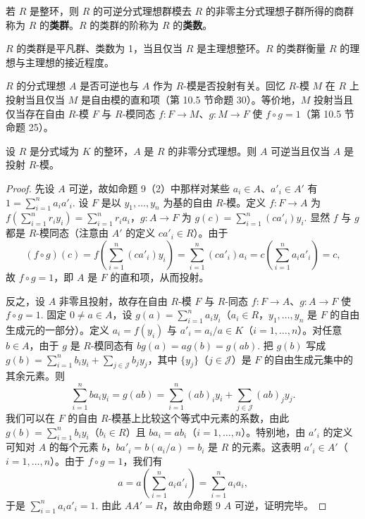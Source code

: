 \begin{definition}
若 \(R\) 是整环，则 \(R\) 的可逆分式理想群模去 \(R\) 的非零主分式理想子群所得的商群称为 \(R\) 的\textbf{类群}。\(R\) 的类群的阶称为 \(R\) 的\textbf{类数}。
\end{definition}

\(R\) 的类群是平凡群、类数为 1，当且仅当 \(R\) 是主理想整环。\(R\) 的类群衡量 \(R\) 的理想与主理想的接近程度。

\(R\) 的分式理想 \(A\) 是否可逆也与 \(A\) 作为 \(R\)-模是否投射有关。回忆 \(R\)-模 \(M\) 在 \(R\) 上投射当且仅当 \(M\) 是自由模的直和项（第 10.5 节命题 30）。等价地，\(M\) 投射当且仅当存在自由 \(R\)-模 \(F\) 与 \(R\)-模同态 \(f : F \to M\)、\(g : M \to F\) 使 \(f \circ g = 1\)（第 10.5 节命题 25）。

\begin{proposition}\label{pro:16.10}
设 \(R\) 是分式域为 \(K\) 的整环，\(A\) 是 \(R\) 的非零分式理想。则 \(A\) 可逆当且仅当 \(A\) 是投射 \(R\)-模。
\end{proposition}

\begin{proof}
先设 \(A\) 可逆，故如命题 9（2）中那样对某些 \(a_i \in A\)、\(a'_i \in A'\) 有 \(1 = \sum_{i=1}^{n}a_ia'_i\). 设 \(F\) 是以 \(y_1, \ldots, y_n\) 为基的自由 \(R\)-模。定义 \(f : F \to A\) 为 \(f(\sum_{i=1}^{n}r_iy_i) = \sum_{i=1}^{n}r_ia_i\)，\(g : A \to F\) 为 \(g(c) = \sum_{i=1}^{n}(ca'_i)y_i\). 显然 \(f\) 与 \(g\) 都是 \(R\)-模同态（注意由 \(A'\) 的定义 \(ca'_i \in R\)）。由于
\[
(f \circ g)(c) = f\left(\sum_{i=1}^{n}(ca'_i)y_i\right) = \sum_{i=1}^{n}(ca'_i)a_i = c\left(\sum_{i=1}^{n}a_ia'_i\right) = c,
\]
故 \(f \circ g = 1\)，即 \(A\) 是 \(F\) 的直和项，从而投射。

反之，设 \(A\) 非零且投射，故存在自由 \(R\)-模 \(F\) 与 \(R\)-同态 \(f : F \to A\)、\(g : A \to F\) 使 \(f \circ g = 1\). 固定 \(0 \neq a \in A\)，设 \(g(a) = \sum_{i=1}^{n}a_iy_i\)（\(a_i \in R\)，\(y_1, \ldots, y_n\) 是 \(F\) 的自由生成元的一部分）。定义 \(a_i = f(y_i)\) 与 \(a'_i = a_i/a \in K\)（\(i = 1, \ldots, n\)）。对任意 \(b \in A\)，由于 \(g\) 是 \(R\)-模同态有 \(bg(a) = ag(b) = g(ab)\). 把 \(g(b)\) 写成 \(g(b) = \sum_{i=1}^{n}b_iy_i+\sum_{j \in \mathcal{J}}b_jy_j\)，其中 \(\{y_j\}\)（\(j \in \mathcal{J}\)）是 \(F\) 的自由生成元集中的其余元素。则
\[
\sum_{i=1}^{n}ba_iy_i = g(ab) = \sum_{i=1}^{n}(ab)_iy_i+\sum_{j \in \mathcal{J}}(ab)_jy_j.
\]
我们可以在 \(F\) 的自由 \(R\)-模基上比较这个等式中元素的系数，由此 \(g(b) = \sum_{i=1}^{n}b_iy_i\)（\(b_i \in R\)）且 \(ba_i = ab_i\)（\(i = 1, \ldots, n\)）。特别地，由 \(a'_i\) 的定义可知对 \(A\) 的每个元素 \(b\)，\(ba'_i = b(a_i/a) = b_i\) 是 \(R\) 的元素。这表明 \(a'_i \in A'\)（\(i = 1, \ldots, n\)）。由于 \(f \circ g = 1\)，我们有
\[
a = a\left(\sum_{i=1}^{n}a_ia'_i\right) = \sum_{i=1}^{n}a_ia_i,
\]
于是 \(\sum_{i=1}^{n}a_ia'_i = 1\). 由此 \(AA' = R\)，故由命题 9 \(A\) 可逆，证明完毕。
\end{proof}


